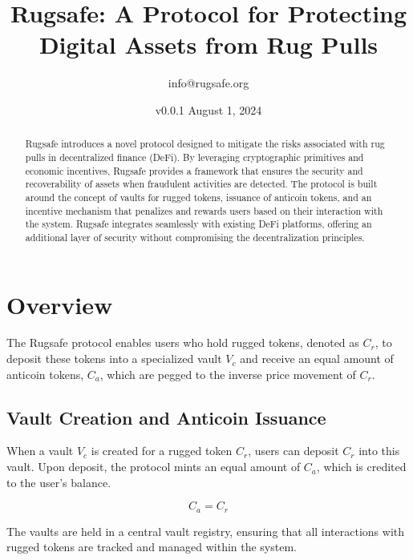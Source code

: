 \documentclass{article}
\title{Rugsafe: A Protocol for Protecting Digital Assets from Rug Pulls}
\author{info@rugsafe.org}
\date{v0.0.1 August 1, 2024}
\begin{document}
\maketitle

\begin{abstract}
Rugsafe introduces a novel protocol designed to mitigate the risks associated with rug pulls in decentralized finance (DeFi). By leveraging cryptographic primitives and economic incentives, Rugsafe provides a framework that ensures the security and recoverability of assets when fraudulent activities are detected. The protocol is built around the concept of vaults for rugged tokens, issuance of anticoin tokens, and an incentive mechanism that penalizes and rewards users based on their interaction with the system. Rugsafe integrates seamlessly with existing DeFi platforms, offering an additional layer of security without compromising the decentralization principles.
\end{abstract}



\section{Overview}

The Rugsafe protocol enables users who hold rugged tokens, denoted as $C_r$, to deposit these tokens into a specialized vault $V_c$ and receive an equal amount of anticoin tokens, $C_a$, which are pegged to the inverse price movement of $C_r$.




\subsection{Vault Creation and Anticoin Issuance}
When a vault $V_c$ is created for a rugged token $C_r$, users can deposit $C_r$ into this vault. Upon deposit, the protocol mints an equal amount of $C_a$, which is credited to the user's balance.

\begin{equation}
C_a = C_r
\end{equation}

The vaults are held in a central vault registry, ensuring that all interactions with rugged tokens are tracked and managed within the system.


\end{document}
